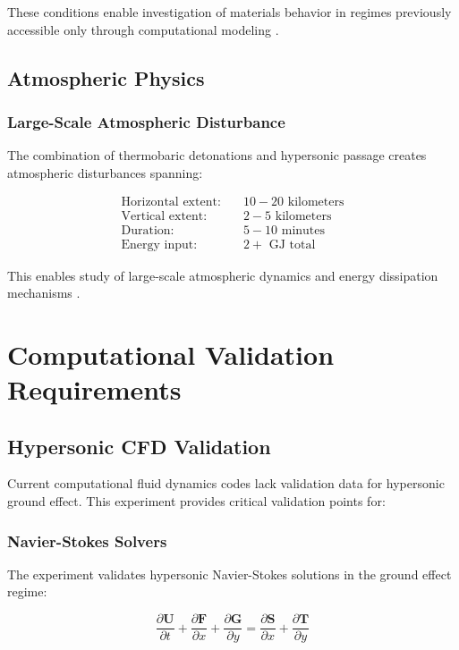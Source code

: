 \documentclass[12pt,a4paper]{article}
\begin{document}
These conditions enable investigation of materials behavior in regimes previously accessible only through computational modeling \cite{anderson2006hypersonic}.

\subsection{Atmospheric Physics}

\subsubsection{Large-Scale Atmospheric Disturbance}
The combination of thermobaric detonations and hypersonic passage creates atmospheric disturbances spanning:

\begin{align}
\text{Horizontal extent:} &\quad 10-20 \text{ kilometers} \\
\text{Vertical extent:} &\quad 2-5 \text{ kilometers} \\
\text{Duration:} &\quad 5-10 \text{ minutes} \\
\text{Energy input:} &\quad 2+ \text{ GJ total}
\end{align}

This enables study of large-scale atmospheric dynamics and energy dissipation mechanisms \cite{zhang2011thermobaric}.

\section{Computational Validation Requirements}

\subsection{Hypersonic CFD Validation}

Current computational fluid dynamics codes lack validation data for hypersonic ground effect. This experiment provides critical validation points for:

\subsubsection{Navier-Stokes Solvers}
The experiment validates hypersonic Navier-Stokes solutions in the ground effect regime:

\begin{equation}
\frac{\partial \mathbf{U}}{\partial t} + \frac{\partial \mathbf{F}}{\partial x} + \frac{\partial \mathbf{G}}{\partial y} = \frac{\partial \mathbf{S}}{\partial x} + \frac{\partial \mathbf{T}}{\partial y}
\label{eq:navier_stokes}
\end{equation}
\end{document}
